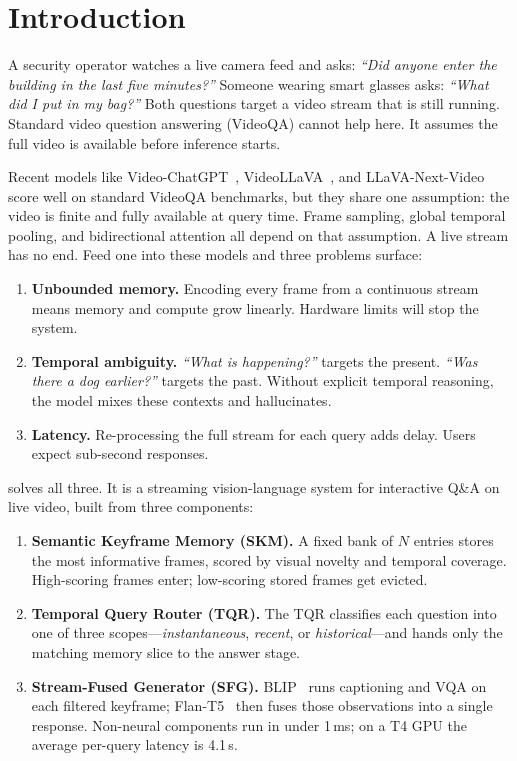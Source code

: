 \section{Introduction}
\label{sec:intro}

A security operator watches a live camera feed and asks: \emph{``Did anyone enter the building in the last five minutes?''}
Someone wearing smart glasses asks: \emph{``What did I put in my bag?''}
Both questions target a video stream that is still running. Standard video question answering (VideoQA) cannot help here. It assumes the full video is available before inference starts.

Recent models like Video-ChatGPT~\cite{maaz2023videochatgpt}, VideoLLaVA~\cite{lin2023videollava}, and LLaVA-Next-Video~\cite{zhang2024llavanextvideo} score well on standard VideoQA benchmarks, but they share one assumption: the video is finite and fully available at query time.
Frame sampling, global temporal pooling, and bidirectional attention all depend on that assumption.
A live stream has no end. Feed one into these models and three problems surface:

\begin{enumerate}[leftmargin=*,itemsep=2pt]
    \item \textbf{Unbounded memory.} Encoding every frame from a continuous stream means memory and compute grow linearly. Hardware limits will stop the system.
    \item \textbf{Temporal ambiguity.} \emph{``What is happening?''} targets the present. \emph{``Was there a dog earlier?''} targets the past. Without explicit temporal reasoning, the model mixes these contexts and hallucinates.
    \item \textbf{Latency.} Re-processing the full stream for each query adds delay. Users expect sub-second responses.
\end{enumerate}

\textbf{\ours} solves all three. It is a streaming vision-language system for interactive Q\&A on live video, built from three components:

\begin{enumerate}[leftmargin=*,itemsep=2pt]
    \item \textbf{Semantic Keyframe Memory (SKM).}
    A fixed bank of $N$ entries stores the most informative frames, scored by visual novelty and temporal coverage. High-scoring frames enter; low-scoring stored frames get evicted.

    \item \textbf{Temporal Query Router (TQR).}
    The TQR classifies each question into one of three scopes---\emph{instantaneous}, \emph{recent}, or \emph{historical}---and hands only the matching memory slice to the answer stage.

    \item \textbf{Stream-Fused Generator (SFG).}
    BLIP~\cite{li2022blip} runs captioning and VQA on each filtered keyframe; Flan-T5~\cite{chung2022flanT5} then fuses those observations into a single response.
    Non-neural components run in under 1\,ms; on a T4 GPU the average per-query latency is 4.1\,s.
\end{enumerate}

